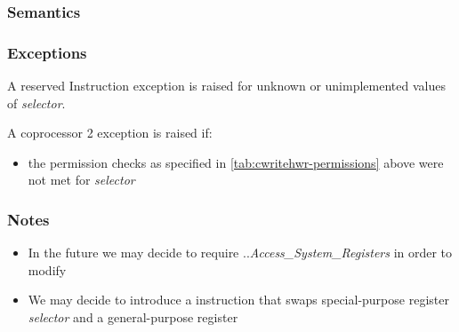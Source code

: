 
\subsubsection*{Semantics}

\subsubsection*{Exceptions}


A reserved Instruction exception is raised for unknown or
unimplemented values of \emph{selector}.

A coprocessor 2 exception is raised if:

\begin{itemize}
\item the permission checks as specified in \autoref{tab:cwritehwr-permissions} above were not met for \emph{selector}
\end{itemize}

\subsubsection*{Notes}

\begin{itemize}
\item In the future we may decide to require \PCC{}.\cperms{}.\emph{Access\_System\_Registers} in order to modify \DDC
\item We may decide to introduce a  instruction that
 swaps special-purpose register \emph{selector} and a general-purpose register
\end{itemize}

